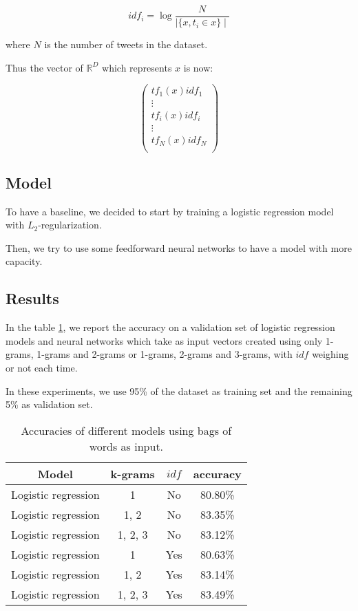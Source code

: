 \documentclass[10pt,conference,compsocconf]{IEEEtran}
\begin{document}
$$
idf_i = \log{\frac{N}{\mid \{x, t_i \in x \} \mid}}
$$

where $N$ is the number of tweets in the dataset.

Thus the vector of $\mathbb{R}^D$ which represents $x$ is now:

$$
\left(
\begin{array}{c}
tf_1(x)idf_1 \\
\vdots \\
tf_i(x)idf_i \\
\vdots \\
tf_N(x)idf_N \\
\end{array}
\right)
$$

\subsection{Model}

To have a baseline, we decided to start by training a logistic regression model with $L_2$-regularization.

Then, we try to use some feedforward neural networks to have a model with more capacity.

\subsection{Results}

In the table \ref{accuracies_bow}, we report the accuracy on a validation set of logistic regression models and neural networks which take as input vectors created using only 1-grams, 1-grams and 2-grams or 1-grams, 2-grams and 3-grams, with $idf$ weighing or not each time.

In these experiments, we use 95\% of the dataset as training set and the remaining 5\% as validation set.

\begin{table}
\begin{center}
\begin{tabular}{|c|c|c|c|}
\hline
Model & k-grams & $idf$ & accuracy \\
\hline
Logistic regression & 1 & No & 80.80\% \\
\hline
Logistic regression & 1, 2 & No & 83.35\% \\
\hline
Logistic regression & 1, 2, 3 & No & 83.12\% \\
\hline
Logistic regression & 1 & Yes & 80.63\% \\
\hline
Logistic regression & 1, 2 & Yes & 83.14\% \\
\hline
Logistic regression & 1, 2, 3 & Yes & 83.49\% \\
\hline
\end{tabular}
\label{accuracies_bow}
\caption{Accuracies of different models using bags of words as input.}
\end{center}
\end{table}
\end{document}
